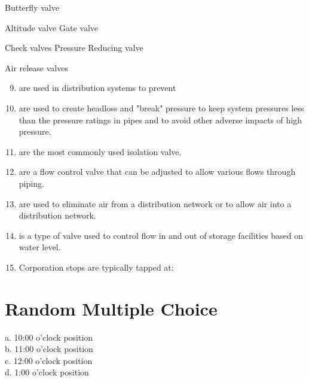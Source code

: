 \documentclass[10pt]{article}
\begin{document}
Butterfly valve

Altitude valve Gate valve

Check valves Pressure Reducing valve

Air release valves

\begin{enumerate}
  \setcounter{enumi}{8}
  \item are used in distribution systems to prevent

  \item are used to create headloss and "break" pressure to keep system pressures less than the pressure ratings in pipes and to avoid other adverse impacts of high pressure.

  \item are the most commonly used isolation valve.

  \item are a flow control valve that can be adjusted to allow various flows through piping.

  \item are used to eliminate air from a distribution network or to allow air into a distribution network.

  \item is a type of valve used to control flow in and out of storage facilities based on water level.

  \item Corporation stops are typically tapped at:

\end{enumerate}
\section{Random Multiple Choice}
a. 10:00 o'clock position\\
b. 11:00 o'clock position\\
c. 12:00 o'clock position\\
d. 1:00 o'clock position
\end{document}
